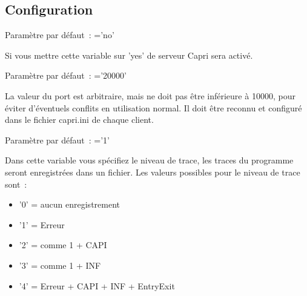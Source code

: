 \subsection{Configuration}
\begin{description}


        Paramètre par défaut~: ='no'

        Si vous mettre cette variable sur 'yes' de serveur Capri sera activé.


        Paramètre par défaut~: ='20000'

        La valeur du port est arbitraire, mais ne doit pas être inférieure à 10000, pour éviter
		d'éventuels conflits en utilisation normal. Il doit être reconnu et configuré dans
		le fichier capri.ini de chaque client.



        Paramètre par défaut~: ='1'

        Dans cette variable vous spécifiez le niveau de trace, les traces du programme
		seront enregistrées dans un fichier.
		Les valeurs possibles pour le niveau de trace sont~:

        \begin{itemize}
            \item '0' = aucun enregistrement
            \item '1' = Erreur
            \item '2' = comme 1 + CAPI
            \item '3' = comme 1 + INF
            \item '4' = Erreur + CAPI + INF + EntryExit
        \end{itemize}




\end{description}
